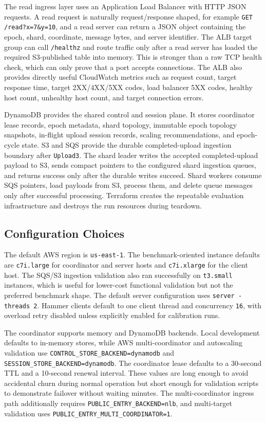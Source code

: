 \documentclass[conference]{IEEEtran}
\begin{document}
The read ingress layer uses an Application Load Balancer with HTTP JSON requests. A read request is naturally request/response shaped, for example \texttt{GET /read?x=7\&y=10}, and a read server can return a JSON object containing the epoch, shard, coordinate, message bytes, and server identifier. The ALB target group can call \texttt{/healthz} and route traffic only after a read server has loaded the required S3-published table into memory. This is stronger than a raw TCP health check, which can only prove that a port accepts connections. The ALB also provides directly useful CloudWatch metrics such as request count, target response time, target 2XX/4XX/5XX codes, load balancer 5XX codes, healthy host count, unhealthy host count, and target connection errors.

DynamoDB provides the shared control and session plane. It stores coordinator lease records, epoch metadata, shard topology, immutable epoch topology snapshots, in-flight upload session records, scaling recommendations, and epoch-cycle state. S3 and SQS provide the durable completed-upload ingestion boundary after \texttt{Upload3}. The shard leader writes the accepted completed-upload payload to S3, sends compact pointers to the configured shard ingestion queues, and returns success only after the durable writes succeed. Shard workers consume SQS pointers, load payloads from S3, process them, and delete queue messages only after successful processing. Terraform creates the repeatable evaluation infrastructure and destroys the run resources during teardown.

\subsection{Configuration Choices}

The default AWS region is \texttt{us-east-1}. The benchmark-oriented instance defaults are \texttt{c7i.large} for coordinator and server hosts and \texttt{c7i.xlarge} for the client host. The SQS/S3 ingestion validation also ran successfully on \texttt{t3.small} instances, which is useful for lower-cost functional validation but not the preferred benchmark shape. The default server configuration uses \texttt{server -threads 2}. Hammer clients default to one client thread and concurrency \texttt{16}, with overload retry disabled unless explicitly enabled for calibration runs.

The coordinator supports memory and DynamoDB backends. Local development defaults to in-memory stores, while AWS multi-coordinator and autoscaling validation use \texttt{CONTROL\_STORE\_BACKEND=dynamodb} and \texttt{SESSION\_STORE\_BACKEND=dynamodb}. The coordinator lease defaults to a 30-second TTL and a 10-second renewal interval. These values are long enough to avoid accidental churn during normal operation but short enough for validation scripts to demonstrate failover without waiting minutes. The multi-coordinator ingress path additionally requires \texttt{PUBLIC\_ENTRY\_BACKEND=nlb}, and multi-target validation uses \texttt{PUBLIC\_ENTRY\_MULTI\_COORDINATOR=1}.
\end{document}
